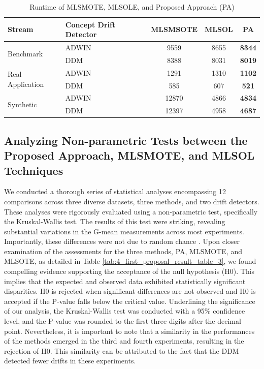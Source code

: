 \begin{table}[h!]
  \centering
  \begin{tabular}{|l|l|c|c|c|}
  \hline
  \textbf{Stream} & \textbf{Concept Drift Detector} & \textbf{MLSMSOTE} & \textbf{MLSOL} & \textbf{PA} \\ \hline
  \multirow{2}{*}{Benchmark} & ADWIN & 9559 & 8655 & \textbf{8344} \\ \cline{2-5} 
   & DDM & 8388 & 8031 & \textbf{8019} \\ \hline
  \multirow{2}{*}{Real Application} & ADWIN & 1291 & 1310 & \textbf{1102} \\ \cline{2-5} 
   & DDM & 585 & 607 & \textbf{521} \\ \hline
  \multirow{2}{*}{Synthetic} & ADWIN & 12870 & 4866 & \textbf{4834} \\ \cline{2-5} 
   & DDM & 12397 & 4958 & \textbf{4687} \\ \hline
  \end{tabular}
  \caption{Runtime of MLSMOTE, MLSOLE, and Proposed Approach (PA)}
  \label{tab:4_first_proposal_result_table_2}
  \end{table}

\subsection{Analyzing Non-parametric Tests between the Proposed Approach, MLSMOTE, and MLSOL Techniques}
We conducted a thorough series of statistical analyses encompassing 12 comparisons across three diverse datasets, three methods, and two drift detectors. These analyses were rigorously evaluated using a non-parametric test, specifically the Kruskal-Wallis test. The results of this test were striking, revealing substantial variations in the G-mean measurements across most experiments. Importantly, these differences were not due to random chance \cite{yamada2013change}. Upon closer examination of the assessments for the three methods, PA, MLSMOTE, and MLSOTE, as detailed in Table \ref{tab:4_first_proposal_result_table_3}, we found compelling evidence supporting the acceptance of the null hypothesis (H0).
This implies that the expected and observed data exhibited statistically significant disparities. H0 is rejected when significant differences are not observed and H0 is accepted if the P-value falls below the critical value. Underlining the significance of our analysis, the Kruskal-Wallis test was conducted with a 95\% confidence level, and the P-value was rounded to the first three digits after the decimal point. Nevertheless, it is important to note that a similarity in the performances of the methods emerged in the third and fourth experiments, resulting in the rejection of H0. This similarity can be attributed to the fact that the DDM detected fewer drifts in these experiments.


